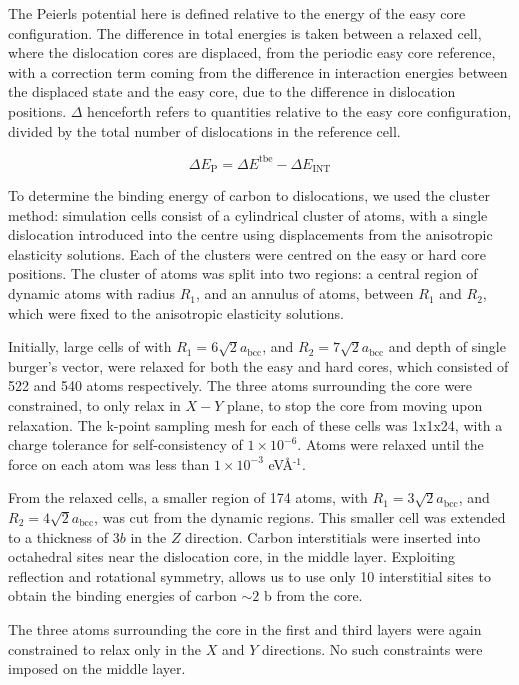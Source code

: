 \documentclass[a4paper,11pt]{article}
\begin{document}
The Peierls potential here is defined relative to the energy of the easy core configuration. The
difference in total energies is taken between a relaxed cell, where the dislocation cores are
displaced, from the periodic easy core reference, with a correction term coming from the
difference in interaction energies between the displaced state and the easy core, due to the
difference in dislocation positions. \(\Delta\) henceforth refers to quantities relative to the easy
core configuration, divided by the total number of dislocations in the reference cell. 

\[ \Delta E_{\text{P}} = \Delta E^{\text{tbe}} - \Delta E_{\text{INT}} \]



To determine the binding energy of carbon to dislocations, we used the
cluster method: simulation cells consist of a cylindrical cluster of
atoms, with a single dislocation introduced into the
centre using displacements from the anisotropic elasticity solutions. Each of the clusters
were centred on the easy or hard core positions. The cluster of atoms was
split into two regions: a central region of dynamic atoms with radius \(R_1\),
and an annulus of atoms, between \(R_1\) and \(R_2\), which were fixed to the anisotropic
elasticity solutions. 

Initially, large cells of with \(R_1 = 6\sqrt{2}a_{\text{bcc}}\), and \(R_2 =
   7\sqrt{2}a_{\text{bcc}}\) and depth of single burger's vector, were relaxed
for both the easy and hard cores, which consisted of 522 and 540 atoms
respectively. The three atoms surrounding the core were constrained, to only
relax in \(X-Y\) plane, to stop the core from moving upon relaxation. The
k-point sampling mesh for each of these cells was 1x1x24, with a charge
tolerance for self-consistency of \(1\times10^{-6}\). Atoms were relaxed until the force
on each atom was less than \(1\times10^{-3}\) eV\AA{}\(^{\text{-1}}\).  

From the relaxed cells, a smaller region of 174 atoms, with \(R_1 =
   3\sqrt{2}a_{\text{bcc}}\), and \(R_2 = 4\sqrt{2}a_{\text{bcc}}\), was cut from
the dynamic regions. This smaller cell was extended to a thickness of 3\(b\) in
the \(Z\) direction. Carbon interstitials were inserted into octahedral sites
near the dislocation core, in the middle layer. Exploiting reflection and
rotational symmetry, allows us to use only 10 interstitial
sites to obtain the binding energies of carbon \(\sim2\) b from the core. 

The three atoms surrounding the core in the first and third layers were again
constrained to relax only in the \(X\) and \(Y\) directions. No such constraints
were imposed on the middle layer. 
\end{document}
